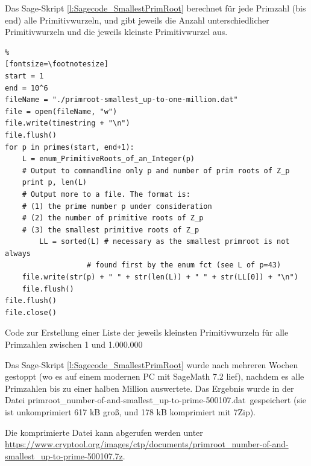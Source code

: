 \begin{refsegment}
\newpage
Das Sage-Skript \ref{l:Sagecode_SmallestPrimRoot} berechnet für jede Primzahl (bis \glqq end\grqq)
alle Primitivwurzeln, und gibt jeweils die Anzahl unterschiedlicher
Primitivwurzeln und die jeweils kleinste Primitivwurzel aus.

\begin{sagecode}
\begin{Verbatim}%
[fontsize=\footnotesize]
start = 1
end = 10^6
fileName = "./primroot-smallest_up-to-one-million.dat"
file = open(fileName, "w")
file.write(timestring + "\n")
file.flush()
for p in primes(start, end+1):
	L = enum_PrimitiveRoots_of_an_Integer(p)
	# Output to commandline only p and number of prim roots of Z_p
	print p, len(L)
	# Output more to a file. The format is:
	# (1) the prime number p under consideration
	# (2) the number of primitive roots of Z_p
	# (3) the smallest primitive roots of Z_p
        LL = sorted(L) # necessary as the smallest primroot is not always
	               # found first by the enum fct (see L of p=43)
	file.write(str(p) + " " + str(len(L)) + " " + str(LL[0]) + "\n")
	file.flush()
file.flush()
file.close()
\end{Verbatim}
\caption{Code zur Erstellung einer Liste der jeweils kleinsten Primitivwurzeln für
	alle Primzahlen zwischen 1 und 1.000.000}
\label{l:Sagecode_SmallestPrimRoot}{}
\end{sagecode}

Das Sage-Skript \ref{l:Sagecode_SmallestPrimRoot} wurde nach mehreren Wochen
gestoppt (wo es auf einem modernen PC mit SageMath 7.2 lief), nachdem es alle
Primzahlen bis zu einer halben Million auswertete. Das Ergebnis wurde in der
Datei \glqq primroot\_number-of-and-smallest\_up-to-prime-500107.dat\grqq~gespeichert
(sie ist unkomprimiert 617 kB groß, und 178 kB komprimiert mit 7Zip).

Die komprimierte Datei kann abgerufen werden unter
\url{https://www.cryptool.org/images/ctp/documents/primroot_number-of-and-smallest_up-to-prime-500107.7z}.


\end{refsegment}
